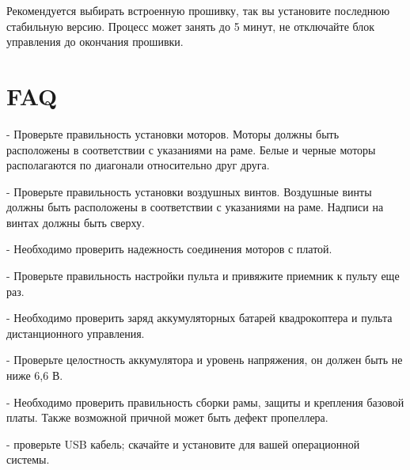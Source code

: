 \documentclass[a4paper,10pt,russian]{sphinxmanual}
\begin{document}

Рекомендуется выбирать встроенную прошивку, так вы установите последнюю стабильную версию.
Процесс может занять до 5 минут, не отключайте блок управления до окончания прошивки.


\chapter{FAQ}
\label{\detokenize{FAQ:faq}}\label{\detokenize{FAQ::doc}}
 -
Проверьте правильность установки моторов. Моторы должны быть расположены в соответствии с указаниями на раме. Белые и черные моторы располагаются по диагонали относительно друг друга.

 - Проверьте правильность установки воздушных винтов. Воздушные винты должны быть расположены в соответствии с указаниями на раме. Надписи на винтах должны быть сверху.

 - Необходимо проверить надежность соединения моторов с платой.

 - Проверьте правильность настройки пульта и привяжите приемник к пульту еще раз.

 - Необходимо проверить заряд аккумуляторных батарей квадрокоптера и пульта дистанционного управления.

 - Проверьте целостность аккумулятора и уровень напряжения, он должен быть не ниже 6,6 В.

 - Необходимо проверить правильность сборки рамы, защиты и крепления базовой платы. Также возможной причной может быть дефект пропеллера.

 - проверьте USB кабель; скачайте и установите  для вашей операционной системы.
\end{document}
